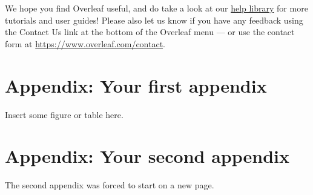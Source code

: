 \documentclass[12pt,a4paper,faculty=ea,language=en,doctype=article]{ugent-doc}
\begin{document}
We hope you find Overleaf useful, and do take a look at our \href{https://www.overleaf.com/learn}{help library} for more tutorials and user guides! Please also let us know if you have any feedback using the Contact Us link at the bottom of the Overleaf menu --- or use the contact form at \url{https://www.overleaf.com/contact}.



\printbibliography[heading=bibintoc,title={References}] %


\appendix
\section{Appendix: Your first appendix}
Insert some figure or table here.

\newpage
\section{Appendix: Your second appendix}
The second appendix was forced to start on a new page.
\end{document}
